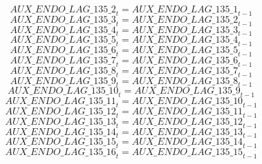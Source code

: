\begin{dmath}
{AUX\_ENDO\_LAG\_135\_2}_{t}={AUX\_ENDO\_LAG\_135\_1}_{t-1}
\end{dmath}
\begin{dmath}
{AUX\_ENDO\_LAG\_135\_3}_{t}={AUX\_ENDO\_LAG\_135\_2}_{t-1}
\end{dmath}
\begin{dmath}
{AUX\_ENDO\_LAG\_135\_4}_{t}={AUX\_ENDO\_LAG\_135\_3}_{t-1}
\end{dmath}
\begin{dmath}
{AUX\_ENDO\_LAG\_135\_5}_{t}={AUX\_ENDO\_LAG\_135\_4}_{t-1}
\end{dmath}
\begin{dmath}
{AUX\_ENDO\_LAG\_135\_6}_{t}={AUX\_ENDO\_LAG\_135\_5}_{t-1}
\end{dmath}
\begin{dmath}
{AUX\_ENDO\_LAG\_135\_7}_{t}={AUX\_ENDO\_LAG\_135\_6}_{t-1}
\end{dmath}
\begin{dmath}
{AUX\_ENDO\_LAG\_135\_8}_{t}={AUX\_ENDO\_LAG\_135\_7}_{t-1}
\end{dmath}
\begin{dmath}
{AUX\_ENDO\_LAG\_135\_9}_{t}={AUX\_ENDO\_LAG\_135\_8}_{t-1}
\end{dmath}
\begin{dmath}
{AUX\_ENDO\_LAG\_135\_10}_{t}={AUX\_ENDO\_LAG\_135\_9}_{t-1}
\end{dmath}
\begin{dmath}
{AUX\_ENDO\_LAG\_135\_11}_{t}={AUX\_ENDO\_LAG\_135\_10}_{t-1}
\end{dmath}
\begin{dmath}
{AUX\_ENDO\_LAG\_135\_12}_{t}={AUX\_ENDO\_LAG\_135\_11}_{t-1}
\end{dmath}
\begin{dmath}
{AUX\_ENDO\_LAG\_135\_13}_{t}={AUX\_ENDO\_LAG\_135\_12}_{t-1}
\end{dmath}
\begin{dmath}
{AUX\_ENDO\_LAG\_135\_14}_{t}={AUX\_ENDO\_LAG\_135\_13}_{t-1}
\end{dmath}
\begin{dmath}
{AUX\_ENDO\_LAG\_135\_15}_{t}={AUX\_ENDO\_LAG\_135\_14}_{t-1}
\end{dmath}
\begin{dmath}
{AUX\_ENDO\_LAG\_135\_16}_{t}={AUX\_ENDO\_LAG\_135\_15}_{t-1}
\end{dmath}
